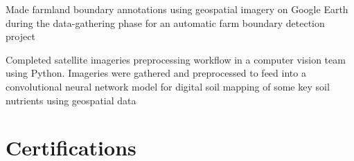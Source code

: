 \documentclass[letterpaper]{deedy-resume} %
\begin{document}
\begin{minipage}[t]{0.66\textwidth}



\begin{tightitemize}
\item Made farmland boundary annotations using geospatial imagery on Google Earth during the data-gathering phase for an automatic farm boundary detection project
\item Completed satellite imageries preprocessing workflow in a computer vision team using Python. Imageries were gathered and preprocessed to feed into a convolutional neural network model for digital soil mapping of some key soil nutrients using geospatial data
\end{tightitemize}
\sectionspace %


\section{Certifications}

\sectionspace


\sectionspace %


\end{minipage} %
\end{document}
